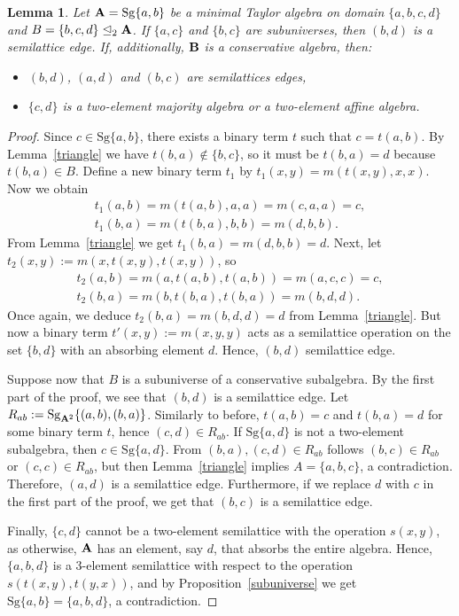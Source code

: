 \documentclass[11pt]{amsart}
\newcommand{\m}[1]{\mathbf{\uppercase{#1}}}
\newtheorem{lem}[thm]{Lemma}
\theoremstyle{definition}
\theoremstyle{remark}
\theoremstyle{plain}
\begin{document}
\begin{lem}\label{triangle2}
Let ${\m A}=\mathrm{Sg}\{a,b\}$ be a minimal Taylor algebra on domain $\{a,b,c,d\}$ and $B=\{b,c,d\}\trianglelefteq_2 {\m A}$. If $\{a,c\}$ and $\{b,c\}$ are subuniverses, then $(b,d)$ is a semilattice edge. If, additionally, $\m b$ is a conservative algebra, then:
\begin{itemize}
\item $(b,d)$, $(a,d)$ and $(b,c)$ are semilattices edges,
\item $\{c,d\}$ is a two-element majority algebra or a two-element affine algebra.
\end{itemize}
\end{lem}
\begin{proof}
Since $c\in\mathrm{Sg}\{a,b\}$, there exists a binary term $t$ such that $c=t(a,b)$. By Lemma~\ref{triangle} we have $t(b,a)\notin \{b,c\}$, so it must be $t(b,a)=d$ because $t(b,a)\in B$. Define a new binary term $t_1$ by $t_1(x,y)=m(t(x,y),x,x)$. Now we obtain
\begin{gather*}
t_1(a,b)=m(t(a,b),a,a)=m(c,a,a)=c,\\
t_1(b,a)=m(t(b,a),b,b)=m(d,b,b).
\end{gather*}
From Lemma~\ref{triangle} we get $t_1(b,a)=m(d,b,b)=d$.
Next, let $t_2(x,y):=m(x,t(x,y),t(x,y))$, so
\begin{gather*}
t_2(a,b)=m(a,t(a,b),t(a,b))=m(a,c,c)=c,\\
t_2(b,a)=m(b,t(b,a),t(b,a))=m(b,d,d).
\end{gather*}
Once again, we deduce $t_2(b,a)=m(b,d,d)=d$ from Lemma~\ref{triangle}.
But now a binary term $t'(x,y):=m(x,y,y)$ acts as a semilattice operation on the set $\{b,d\}$ with an absorbing element $d$. Hence, $(b,d)$ semilattice edge.

Suppose now that $B$ is a subuniverse of a conservative subalgebra.
By the first part of the proof, we see that $(b,d)$ is a semilattice edge. Let $R_{ab}:=\mathrm{Sg}_{\m a^2}\{(a,b),(b,a)\}$. Similarly to before, $t(a,b)=c$ and $t(b,a)=d$ for some binary term $t$, hence $(c,d)\in R_{ab}$.
If $\mathrm{Sg}\{a,d\}$ is not a two-element subalgebra, then $c\in \mathrm{Sg}\{a,d\}$. From $(b,a), (c,d)\in R_{ab}$ follows $(b,c)\in R_{ab}$ or $(c,c)\in R_{ab}$, but then Lemma~\ref{triangle} implies $A=\{a,b,c\}$, a contradiction. Therefore, $(a,d)$ is a semilattice edge. Furthermore, if we replace $d$ with $c$ in the first part of the proof, we get that $(b,c)$ is a semilattice edge. 

Finally, $\{c,d\}$ cannot be a two-element semilattice with the operation $s(x,y)$, as otherwise, $\m A$ has an element, say $d$, that absorbs the entire algebra. Hence, $\{a,b,d\}$ is a 3-element semilattice with respect to the operation $s(t(x,y),t(y,x))$, and by Proposition~\ref{subuniverse} we get $\mathrm{Sg}\{a,b\}=\{a,b,d\}$, a contradiction.
\end{proof}
\end{document}
